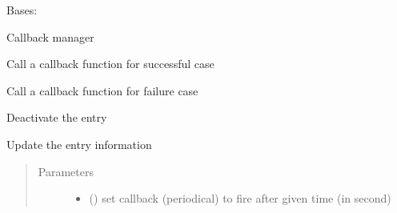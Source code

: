 \documentclass[letterpaper,10pt,english]{sphinxmanual}
\begin{document}
\begin{fulllineitems}
\label{\detokenize{bbc1.core.query_management:bbc1.core.query_management.QueryEntry}}
Bases: 

Callback manager

\begin{fulllineitems}
\label{\detokenize{bbc1.core.query_management:bbc1.core.query_management.QueryEntry.callback}}
Call a callback function for successful case

\end{fulllineitems}


\begin{fulllineitems}
\label{\detokenize{bbc1.core.query_management:bbc1.core.query_management.QueryEntry.callback_error}}
Call a callback function for failure case

\end{fulllineitems}


\begin{fulllineitems}
\label{\detokenize{bbc1.core.query_management:bbc1.core.query_management.QueryEntry.deactivate}}
Deactivate the entry

\end{fulllineitems}


\begin{fulllineitems}
\label{\detokenize{bbc1.core.query_management:bbc1.core.query_management.QueryEntry.update}}
Update the entry information
\begin{quote}\begin{description}
\item[{Parameters}] \leavevmode\begin{itemize}
\item {} 
 () \textendash{} set callback (periodical) to fire after given time (in second)


\end{itemize}
\end{description}
\end{quote}
\end{fulllineitems}
\end{fulllineitems}
\end{document}

